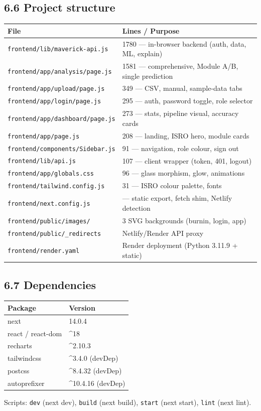 \documentclass[11pt,a4paper]{article}
\newcommand{\code}[1]{\texttt{\small #1}}
\begin{document}
\subsection*{6.6 Project structure}
\begin{center}
\begin{tabular}{@{}ll@{}}
\toprule
\textbf{File} & \textbf{Lines / Purpose}\\
\midrule
\code{frontend/lib/maverick-api.js} & 1780 --- in-browser backend (auth, data, ML, explain)\\
\code{frontend/app/analysis/page.js} & 1581 --- comprehensive, Module A/B, single prediction\\
\code{frontend/app/upload/page.js} & 349 --- CSV, manual, sample-data tabs\\
\code{frontend/app/login/page.js} & 295 --- auth, password toggle, role selector\\
\code{frontend/app/dashboard/page.js} & 273 --- stats, pipeline visual, accuracy cards\\
\code{frontend/app/page.js} & 208 --- landing, ISRO hero, module cards\\
\code{frontend/components/Sidebar.js} & 91 --- navigation, role colour, sign out\\
\code{frontend/lib/api.js} & 107 --- client wrapper (token, 401, logout)\\
\code{frontend/app/globals.css} & 96 --- glass morphism, glow, animations\\
\code{frontend/tailwind.config.js} & 31 --- ISRO colour palette, fonts\\
\code{frontend/next.config.js} & --- static export, fetch shim, Netlify detection\\
\code{frontend/public/images/} & 3 SVG backgrounds (burnin, login, app)\\
\code{frontend/public/\_redirects} & Netlify/Render API proxy\\
\code{frontend/render.yaml} & Render deployment (Python 3.11.9 + static)\\
\bottomrule
\end{tabular}
\end{center}

\subsection*{6.7 Dependencies}
\begin{center}
\begin{tabular}{@{}ll@{}}
\toprule
\textbf{Package} & \textbf{Version}\\
\midrule
next & 14.0.4\\
react / react-dom & \^{ }18\\
recharts & \^{ }2.10.3\\
tailwindcss & \^{ }3.4.0 (devDep)\\
postcss & \^{ }8.4.32 (devDep)\\
autoprefixer & \^{ }10.4.16 (devDep)\\
\bottomrule
\end{tabular}
\end{center}
Scripts: \code{dev} (next dev), \code{build} (next build), \code{start} (next start),
\code{lint} (next lint).
\end{document}
